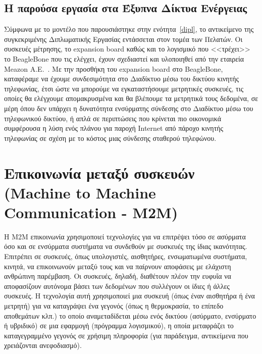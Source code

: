 \documentclass[12pt, a4paper, oneside]{report}
\begin{document}
\section{Η παρούσα εργασία στα Έξυπνα Δίκτυα Ενέργειας}

Σύμφωνα με το μοντέλο που παρουσιάστηκε στην ενότητα~\ref{dipl}, το αντικείμενο της συγκεκριμένης Διπλωματικής Εργασίας εντάσσεται στον τομέα των Πελατών. Οι συσκευές μέτρησης, το expansion board καθώς και το λογισμικό που <<τρέχει>> το BeagleBone που τις ελέγχει, έχουν σχεδιαστεί και υλοποιηθεί από την εταιρεία Meazon Α.Ε.~. Με την προσθήκη του expansion board στο BeagleBone, καταφέραμε να έχουμε συνδεσιμότητα στο Διαδίκτυο μέσω του δικτύου κινητής τηλεφωνίας, έτσι ώστε να μπορούμε να εγκαταστήσουμε μετρητικές συσκευές, τις οποίες θα ελέγχουμε απομακρυσμένα και θα βλέπουμε τα μετρητικά τους δεδομένα,  σε μέρη όπου δεν υπάρχει η δυνατότητα ενσύρματης σύνδεσης στο Διαδίκτυο μέσω του τηλεφωνικού δικτύου, ή απλά σε περιπτώσεις που κρίνεται πιο οικονομικά συμφέρουσα η λύση ενός πλάνου για παροχή Internet από πάροχο κινητής τηλεφωνίας σε σχέση με το κόστος μιας σύνδεσης σταθερού τηλεφώνου.

\chapter[Επικοινωνία μεταξύ συσκευών - Μ2Μ]{Επικοινωνία μεταξύ συσκευών (Machine to Machine Communication - M2M)}

Η Μ2Μ επικοινωνία χρησιμοποιεί τεχνολογίες για να επιτρέψει τόσο σε ασύρματα όσο και σε ενσύρματα συστήματα να συνδεθούν με συσκευές της ίδιας ικανότητας. Επιτρέπει σε συσκευές, όπως υπολογιστές, αισθητήρες, ενσωματωμένα συστήματα, κινητά, να επικοινωνούν μεταξύ τους και να παίρνουν αποφάσεις με ελάχιστη ανθρώπινη παρέμβαση. Οι συσκευές, δηλαδή, διαθέτουν πλέον την ευφυΐα να αποφασίζουν αυτόνομα βάσει των δεδομένων που συλλέγουν οι ίδιες ή άλλες συσκευές. Η τεχνολογία αυτή χρησιμοποιεί μια συσκευή (όπως έναν αισθητήρα ή ένα μετρητή) για να καταγράψει ένα γεγονός (όπως η θερμοκρασία, το επίπεδο αποθεμάτων κλπ.) το οποίο αναμεταδίδεται μέσω ενός δικτύου (ασύρματο, ενσύρματο ή υβριδικό) σε μια εφαρμογή (πρόγραμμα λογισμικού), η οποία μεταφράζει το καταγεγραμμένο γεγονός σε χρήσιμη πληροφορία (για παράδειγμα, αντικείμενα που χρειάζονται ανεφοδιασμό).
\end{document}
